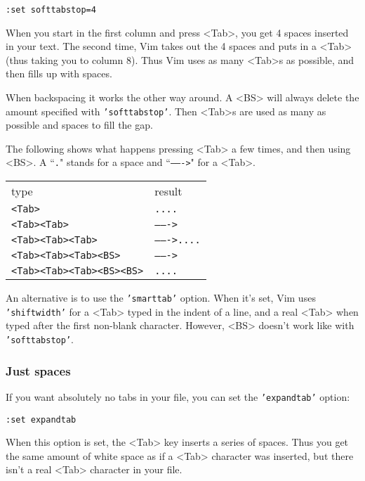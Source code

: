 \begin{Verbatim}[samepage=true]
 :set softtabstop=4
\end{Verbatim}

When you start in the first column and press <Tab>, you get 4 spaces inserted in your text.
The second time, Vim takes out the 4 spaces and puts in a <Tab> (thus taking you to column 8).
Thus Vim uses as many <Tab>s as possible, and then fills up with spaces.

When backspacing it works the other way around.
A <BS> will always delete the amount specified with \texttt{'softtabstop'}.
Then <Tab>s are used as many as possible and spaces to fill the gap.

The following shows what happens pressing <Tab> a few times, and then using <BS>.
A ``\texttt{.}" stands for a space and ``\texttt{------->}" for a <Tab>.

\begin{center} \begin{tabular}{l l}
type & result \\ 
\texttt{<Tab>} & \texttt{....} \\
\texttt{<Tab><Tab>} & \texttt{------->} \\
\texttt{<Tab><Tab><Tab>} & \texttt{------->....} \\
\texttt{<Tab><Tab><Tab><BS>} & \texttt{------->} \\
\texttt{<Tab><Tab><Tab><BS><BS>} & \texttt{....} \\		
\end{tabular} \end{center}

An alternative is to use the \texttt{'smarttab'} option.
When it's set, Vim uses \texttt{'shiftwidth'} for a <Tab> typed in the indent of a line, and a real <Tab> when typed after the first non-blank character.
However, <BS> doesn't work like with \texttt{'softtabstop'}.

\subsubsection{Just spaces}
If you want absolutely no tabs in your file, you can set the \texttt{'expandtab'} option:

\begin{Verbatim}[samepage=true]
 :set expandtab
\end{Verbatim}

When this option is set, the <Tab> key inserts a series of spaces.
Thus you get the same amount of white space as if a <Tab> character was inserted, but there isn't a real <Tab> character in your file.

